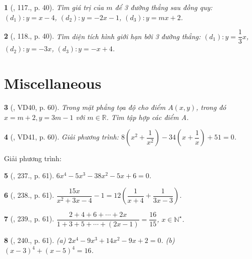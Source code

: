 \documentclass{article}
\newtheorem{baitoan}{}
\begin{document}
\begin{baitoan}[\cite{Tuyen_Toan_9_old}, 117., p. 40]
	Tìm giá trị của $m$ để 3 đường thẳng sau đồng quy: $(d_1):y = x - 4$, $(d_2):y = -2x - 1$, $(d_3):y = mx + 2$.
\end{baitoan}

\begin{baitoan}[\cite{Tuyen_Toan_9_old}, 118., p. 40]
	Tìm diện tích hình giới hạn bởi 3 đường thẳng: $(d_1):y = \dfrac{1}{3}x$, $(d_2):y = -3x$, $(d_3):y = -x + 4$.
\end{baitoan}


\section{Miscellaneous}

\begin{baitoan}[\cite{Tuyen_Toan_8}, VD40, p. 60]
	Trong mặt phẳng tọa độ cho điểm $A(x,y)$, trong đó $x = m + 2,y = 3m - 1$ với $m\in\mathbb{R}$. Tìm tập hợp các điểm A.
\end{baitoan}

\begin{baitoan}[\cite{Tuyen_Toan_8}, VD41, p. 60]
	Giải phương trình: $8\left(x^2 + \dfrac{1}{x^2}\right) - 34\left(x + \dfrac{1}{x}\right) + 51 = 0$.
\end{baitoan}
Giải phương trình:

\begin{baitoan}[\cite{Tuyen_Toan_8}, 237., p. 61]
	$6x^4 - 5x^3 - 38x^2 - 5x + 6 = 0$.
\end{baitoan}

\begin{baitoan}[\cite{Tuyen_Toan_8}, 238., p. 61]
	$\dfrac{15x}{x^2 + 3x - 4} - 1 = 12\left(\dfrac{1}{x + 4} + \dfrac{1}{3x - 3}\right)$.
\end{baitoan}

\begin{baitoan}[\cite{Tuyen_Toan_8}, 239., p. 61]
	$\dfrac{2 + 4 + 6 + \cdots + 2x}{1 + 3 + 5 + \cdots + (2x - 1)} = \dfrac{16}{15}$, $x\in\mathbb{N}^\star$.
\end{baitoan}

\begin{baitoan}[\cite{Tuyen_Toan_8}, 240., p. 61]
	(a) $2x^4 - 9x^3 + 14x^2 - 9x + 2 = 0$. (b) $(x - 3)^4 + (x - 5)^4 = 16$.
\end{baitoan}
\end{document}
